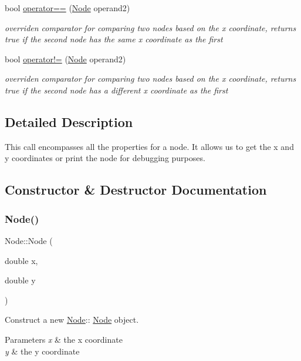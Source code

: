 \begin{DoxyCompactItemize}
bool \hyperlink{classNode_a7c1303e143bf8c170fbfa8e5fab9f88e}{operator==} (\hyperlink{classNode}{Node} operand2)
\begin{DoxyCompactList}\small\item\em overriden comparator for comparing two nodes based on the x coordinate, returns true if the second node has the same x coordinate as the first \end{DoxyCompactList}\item 
bool \hyperlink{classNode_a6fb364f31ad72d22d3ac821e32233c26}{operator!=} (\hyperlink{classNode}{Node} operand2)
\begin{DoxyCompactList}\small\item\em overriden comparator for comparing two nodes based on the x coordinate, returns true if the second node has a different x coordinate as the first \end{DoxyCompactList}\end{DoxyCompactItemize}


\subsection{Detailed Description}
This call encompasses all the properties for a node. It allows us to get the x and y coordinates or print the node for debugging purposes. 

\subsection{Constructor \& Destructor Documentation}
\mbox{\label{classNode_ab488e53f2acfc84ef0cacc1951f92c3d}} 
\subsubsection{\texorpdfstring{Node()}{Node()}}
{\footnotesize\ttfamily Node\+::\+Node (\begin{DoxyParamCaption}\item[{double}]{x,  }\item[{double}]{y }\end{DoxyParamCaption})}



Construct a new \hyperlink{classNode}{Node}\+:\+: \hyperlink{classNode}{Node} object. 


\begin{DoxyParams}{Parameters}
{\em x} & the x coordinate \\
\hline
{\em y} & the y coordinate \\
\hline
\end{DoxyParams}


